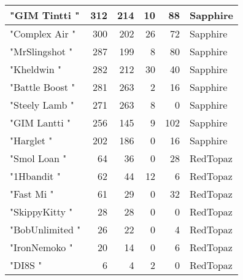 \documentclass{article}
\begin{document}
\begin{table}[htbp]
\begin{tabular}{|l|r|r|r|r|l|}
"GIM Tintti " & 312 & 214 & 10 & 88 & Sapphire \\ \hline
"Complex Air " & 300 & 202 & 26 & 72 & Sapphire \\ \hline
"MrSlingshot " & 287 & 199 & 8 & 80 & Sapphire \\ \hline
"Kheldwin " & 282 & 212 & 30 & 40 & Sapphire \\ \hline
"Battle Boost " & 281 & 263 & 2 & 16 & Sapphire \\ \hline
"Steely Lamb " & 271 & 263 & 8 & 0 & Sapphire \\ \hline
"GIM Lantti " & 256 & 145 & 9 & 102 & Sapphire \\ \hline
"Harglet " & 202 & 186 & 0 & 16 & Sapphire \\ \hline
"Smol Loan " & 64 & 36 & 0 & 28 & RedTopaz \\ \hline
"1Hbandit " & 62 & 44 & 12 & 6 & RedTopaz \\ \hline
"Fast Mi " & 61 & 29 & 0 & 32 & RedTopaz \\ \hline
"SkippyKitty " & 28 & 28 & 0 & 0 & RedTopaz \\ \hline
"BobUnlimited " & 26 & 22 & 0 & 4 & RedTopaz \\ \hline
"IronNemoko " & 20 & 14 & 0 & 6 & RedTopaz \\ \hline
"DI8S " & 6 & 4 & 2 & 0 & RedTopaz \\ \hline
\end{tabular}
\end{table}
\end{document}
